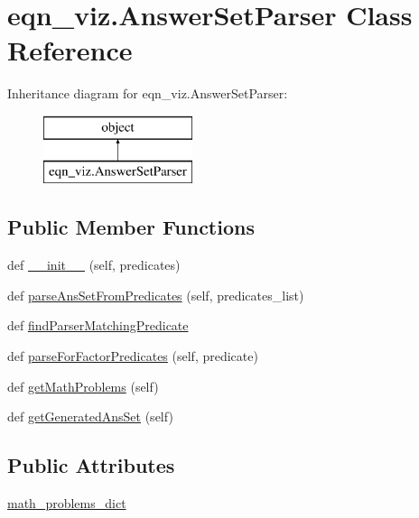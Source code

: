 \hypertarget{classeqn__viz_1_1_answer_set_parser}{}\section{eqn\+\_\+viz.\+Answer\+Set\+Parser Class Reference}
\label{classeqn__viz_1_1_answer_set_parser}
Inheritance diagram for eqn\+\_\+viz.\+Answer\+Set\+Parser\+:\begin{figure}[H]
\begin{center}
\leavevmode
\includegraphics[height=2.000000cm]{classeqn__viz_1_1_answer_set_parser}
\end{center}
\end{figure}
\subsection*{Public Member Functions}
\begin{DoxyCompactItemize}
\item 
def \hyperlink{classeqn__viz_1_1_answer_set_parser_a250d2c845dbf332c9b1b1075eb357e99}{\+\_\+\+\_\+init\+\_\+\+\_\+} (self, predicates)
\item 
def \hyperlink{classeqn__viz_1_1_answer_set_parser_afa299b43fbe33fdefb8b2f2e33bac3a4}{parse\+Ans\+Set\+From\+Predicates} (self, predicates\+\_\+list)
\item 
def \hyperlink{classeqn__viz_1_1_answer_set_parser_a094b4e636447626a4f20cc12564758bf}{find\+Parser\+Matching\+Predicate}
\item 
def \hyperlink{classeqn__viz_1_1_answer_set_parser_a9133543e2c740202778d7cff12c7450c}{parse\+For\+Factor\+Predicates} (self, predicate)
\item 
def \hyperlink{classeqn__viz_1_1_answer_set_parser_ae3ed1620e24310cc4b448fd84d74c8a7}{get\+Math\+Problems} (self)
\item 
def \hyperlink{classeqn__viz_1_1_answer_set_parser_afebeba4a5dafaa167d0b7a2e76315a09}{get\+Generated\+Ans\+Set} (self)
\end{DoxyCompactItemize}
\subsection*{Public Attributes}
\begin{DoxyCompactItemize}
\item 
\hyperlink{classeqn__viz_1_1_answer_set_parser_aaf05269f220f98b07c9456d89ddca538}{math\+\_\+problems\+\_\+dict}
\end{DoxyCompactItemize}


